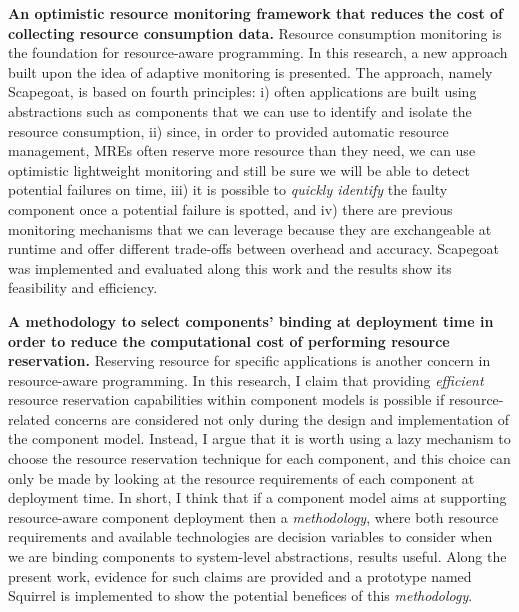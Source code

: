 \textbf{An optimistic resource monitoring framework that reduces the cost of collecting resource consumption data.}
Resource consumption monitoring is the foundation for resource-aware programming.
In this research, a new approach built upon the idea of adaptive monitoring is presented.
The approach, namely Scapegoat, is based on fourth principles: i) often applications are built using abstractions such as components that we can use to identify and isolate the resource consumption, ii) since, in order to provided automatic resource management, MREs often reserve more resource than they need, we can use optimistic lightweight monitoring and still be sure we will be able to detect potential failures on time, iii) it is possible to \textit{quickly identify} the faulty component once a potential failure is spotted, and iv) there are previous monitoring mechanisms that we can leverage because they are exchangeable at runtime and offer different trade-offs between overhead and accuracy.
Scapegoat was implemented and evaluated along this work and the results show its feasibility and efficiency.

\textbf{A methodology to select components' binding at deployment time in order to reduce the computational cost of performing resource reservation.}
Reserving resource for specific applications is another concern in resource-aware programming.
In this research, I claim that providing \textit{efficient} resource reservation capabilities within component models is possible if resource-related concerns are considered not only during the design and implementation of the component model.
Instead, I argue that it is worth using a lazy mechanism to choose the resource reservation technique for each component, and this choice can only be made by looking at the resource requirements of each component at deployment time.
In short, I think that if a component model aims at supporting resource-aware component deployment then a \textit{methodology}, where both resource requirements and available technologies are decision variables to consider when we are binding components to system-level abstractions, results useful.
Along the present work, evidence for such claims are provided and a prototype named Squirrel is implemented to show the potential benefices of this \textit{methodology}.

